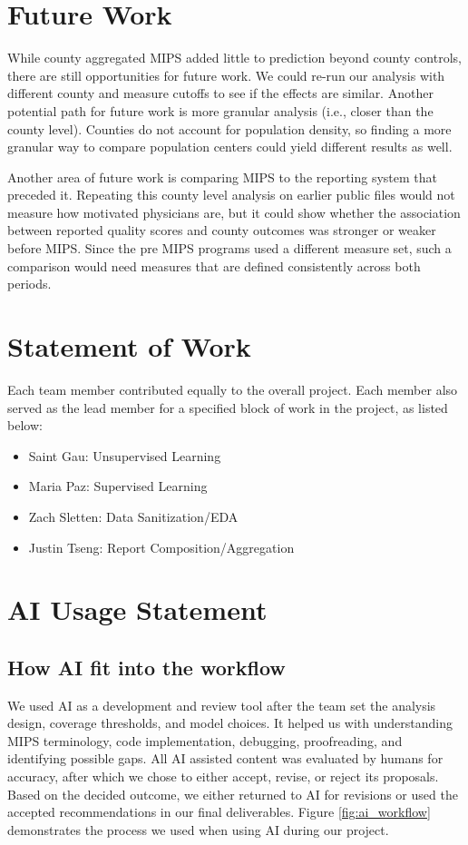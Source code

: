 \documentclass[12pt]{article}
\begin{document}
\section{Future Work}
While county aggregated MIPS added little to prediction beyond county controls, there are still opportunities for future work. We could re-run our analysis with different county and measure cutoffs to see if the effects are similar. Another potential path for future work is more granular analysis (i.e., closer than the county level). Counties do not account for population density, so finding a more granular way to compare population centers could yield different results as well.

Another area of future work is comparing MIPS to the reporting system that preceded it. Repeating this county level analysis on earlier public files would not measure how motivated physicians are, but it could show whether the association between reported quality scores and county outcomes was stronger or weaker before MIPS. Since the pre MIPS programs used a different measure set, such a comparison would need measures that are defined consistently across both periods.


\appendix

\newpage

\section{Statement of Work}
Each team member contributed equally to the overall project. Each member also served as the lead member for a specified block of work in the project, as listed below:
\begin{itemize}
  \item Saint Gau: Unsupervised Learning
  \item Maria Paz: Supervised Learning
  \item Zach Sletten: Data Sanitization/EDA
  \item Justin Tseng: Report Composition/Aggregation
\end{itemize}

\newpage

\section{AI Usage Statement}

\subsection{How AI fit into the workflow}
We used AI as a development and review tool after the team set the analysis design, coverage thresholds, and model choices. It helped us with understanding MIPS terminology, code implementation, debugging, proofreading, and identifying possible gaps. All AI assisted content was evaluated by humans for accuracy, after which we chose to either accept, revise, or reject its proposals. Based on the decided outcome, we either returned to AI for revisions or used the accepted recommendations in our final deliverables. Figure \ref{fig:ai_workflow} demonstrates the process we used when using AI during our project.
\end{document}
